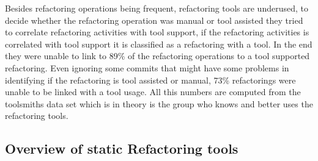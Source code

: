 Besides refactoring operations being frequent, refactoring tools are underused, to decide whether the refactoring operation was manual or tool assisted they tried to correlate refactoring activities with tool support, if the refactoring activities is correlated with tool support it is classified as a refactoring with a tool. In the end they were unable to link to 89\% of the refactoring operations to a tool supported refactoring. Even ignoring some commits that might have some problems in identifying if the refactoring is tool assisted or manual, 73\% refactorings were unable to be linked with a tool usage.
All this numbers are computed from the toolsmiths data set which is in theory is the group who knows and better uses the refactoring tools.


\subsection{Overview of static Refactoring tools}

